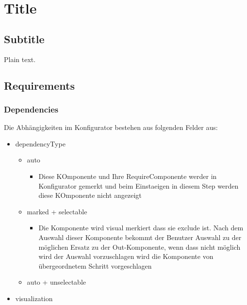 \documentclass{article}
\begin{document}
\section{Title}

\subsection{Subtitle}

Plain text.

\subsection{Requirements}

\subsubsection{Dependencies}

Die Abhängigkeiten im Konfigurator bestehen aus folgenden Felder aus:

\begin{itemize} 
\item dependencyType
\begin{itemize}
  \item auto 
    \begin{itemize}
      \item Diese KOmponente und Ihre RequireComponente werder in Konfigurator
      gemerkt und beim Einstaeigen in diesem Step werden diese KOmponente nicht
      angezeigt
    
    \end{itemize}
  \item marked + selectable
  \begin{itemize}
    \item Die Komponente wird visual merkiert dass sie exclude ist. Nach dem
    Auswahl dieser Komponente bekommt der Benutzer Auswahl zu der möglichen
    Ersatz zu der Out-Komponente, wenn dass nicht möglich wird der Auswahl
    vorzuschlagen wird die Komponente von übergeordnetem Schritt vorgeschlagen
    
  \end{itemize}
  \item auto + unselectable
\end{itemize}
\item visualization

\end{itemize}
\end{document}
